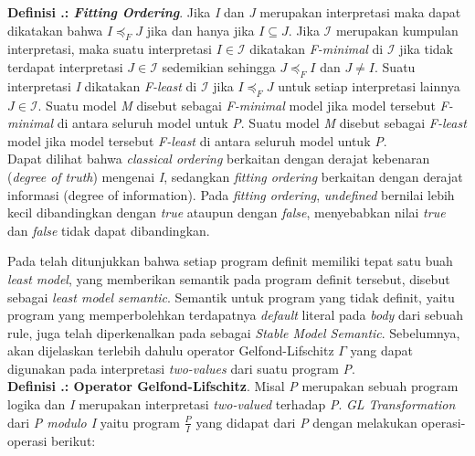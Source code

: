 \noindent \textbf{Definisi \thebabDuaNum.\thedefBabDua: \textit{Fitting Ordering}}. Jika \textit{I} dan \textit{J} merupakan interpretasi maka dapat dikatakan bahwa $I \preceq_F J$ jika dan hanya jika $I \subseteq J$. Jika $\mathcal{I}$ merupakan kumpulan interpretasi, maka suatu interpretasi $I \in \mathcal{I}$ dikatakan \textit{F-minimal} di $\mathcal{I}$ jika tidak terdapat interpretasi $J \in \mathcal{I}$ sedemikian sehingga $J \preceq_F I$ dan $J \neq I$. Suatu interpretasi \textit{I} dikatakan \textit{F-least} di $\mathcal{I}$ jika $I \preceq_F J$ untuk setiap interpretasi lainnya $J \in \mathcal{I}$. Suatu model \textit{M} disebut sebagai \textit{F-minimal} model jika model tersebut \textit{F-minimal} di antara seluruh model untuk \textit{P}. Suatu model \textit{M} disebut sebagai \textit{F-least} model jika model tersebut \textit{F-least} di antara seluruh model untuk \textit{P}.
\\

Dapat dilihat bahwa \textit{classical ordering} berkaitan dengan derajat kebenaran (\textit{degree of truth}) mengenai \textit{I}, sedangkan \textit{fitting ordering} berkaitan dengan derajat informasi (degree of information). Pada \textit{fitting ordering}, \textit{undefined} bernilai lebih kecil dibandingkan dengan \textit{true} ataupun dengan \textit{false}, menyebabkan nilai \textit{true} dan \textit{false} tidak dapat dibandingkan.

Pada \citep{van1976semantics} telah ditunjukkan bahwa setiap program definit memiliki tepat satu buah \textit{least model}, yang memberikan semantik pada program definit tersebut, disebut sebagai \textit{least model semantic}. Semantik untuk program yang tidak definit, yaitu program yang memperbolehkan terdapatnya \textit{default} literal pada \textit{body} dari sebuah rule, juga telah diperkenalkan pada \citep{gelfond1988stable} sebagai \textit{Stable Model Semantic}. Sebelumnya, akan dijelaskan terlebih dahulu operator Gelfond-Lifschitz $\Gamma$ yang dapat digunakan pada interpretasi \textit{two-values} dari suatu program \textit{P}.
\\

\noindent \textbf{Definisi \thebabDuaNum.\thedefBabDua: Operator Gelfond-Lifschitz}. Misal \textit{P} merupakan sebuah program logika dan \textit{I} merupakan interpretasi \textit{two-valued} terhadap \textit{P}. \textit{GL Transformation} dari \textit{P modulo I} yaitu program $\frac{P}{I}$ yang didapat dari \textit{P} dengan melakukan operasi-operasi berikut:

